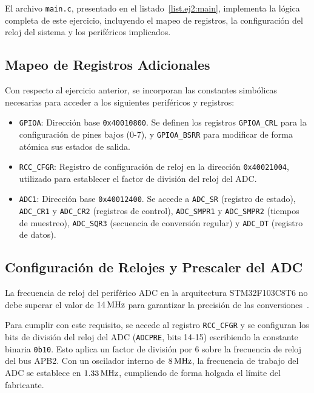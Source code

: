 El archivo \texttt{main.c}, presentado en el listado~\ref{list.ej2:main}, implementa la lógica completa de este
ejercicio, incluyendo el mapeo de registros, la configuración del reloj del sistema y los periféricos implicados.



\subsection{Mapeo de Registros Adicionales}

Con respecto al ejercicio anterior, se incorporan las constantes simbólicas necesarias para acceder a los siguientes
periféricos y registros:
\begin{itemize}
    \item \texttt{GPIOA}: Dirección base \texttt{0x40010800}. Se definen los registros \texttt{GPIOA\_CRL} para la
    configuración de pines bajos (0-7), y \texttt{GPIOA\_BSRR} para modificar de forma atómica sus estados de salida.
    \item \texttt{RCC\_CFGR}: Registro de configuración de reloj en la dirección \texttt{0x40021004}, utilizado para
    establecer el factor de división del reloj del ADC.
    \item \texttt{ADC1}: Dirección base \texttt{0x40012400}. Se accede a \texttt{ADC\_SR} (registro de estado),
    \texttt{ADC\_CR1} y \texttt{ADC\_CR2} (registros de control), \texttt{ADC\_SMPR1} y \texttt{ADC\_SMPR2} (tiempos
    de muestreo), \texttt{ADC\_SQR3} (secuencia de conversión regular) y \texttt{ADC\_DT} (registro de datos).
\end{itemize}

\subsection{Configuración de Relojes y Prescaler del ADC}

La frecuencia de reloj del periférico ADC en la arquitectura STM32F103C8T6 no debe superar el valor de $14\,\mathrm{MHz}$ para
garantizar la precisión de las conversiones~\cite{stm32f103rm}.

Para cumplir con este requisito, se accede al registro \texttt{RCC\_CFGR} y se configuran los bits de división del
reloj del ADC (\texttt{ADCPRE}, bits 14-15) escribiendo la constante binaria \texttt{0b10}. Esto aplica un factor de
división por 6 sobre la frecuencia de reloj del bus APB2. Con un oscilador interno de $8\,\mathrm{MHz}$, la frecuencia de trabajo
del ADC se establece en $1.33\,\mathrm{MHz}$, cumpliendo de forma holgada el límite del fabricante.


